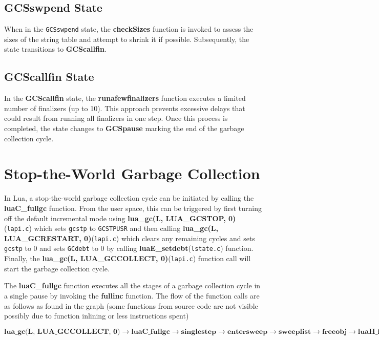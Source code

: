 \documentclass[10pt]{article}
\begin{document}
\subsection{GCSswpend State}
When in the \texttt{GCSswpend} state, the \textbf{checkSizes} function is invoked to assess the sizes of the string table and attempt to shrink it if possible. Subsequently, the state transitions to \textbf{GCScallfin}.

\subsection{GCScallfin State}
In the \textbf{GCScallfin} state, the \textbf{runafewfinalizers} function executes a limited number of finalizers (up to 10). This approach prevents excessive delays that could result from running all finalizers in one step. Once this process is completed, the state changes to \textbf{GCSpause} marking the end of the garbage collection cycle.

\section{Stop-the-World Garbage Collection} \label{sec:stop_the_world}
In Lua, a stop-the-world garbage collection cycle can be initiated by calling the \textbf{luaC\_fullgc} function. From the user space, this can be triggered by first turning off the default incremental mode using \textbf{lua\_gc(L, LUA\_GCSTOP, 0)}(\texttt{lapi.c}) which sets \texttt{gcstp} to \texttt{GCSTPUSR} and then calling \textbf{lua\_gc(L, LUA\_GCRESTART, 0)}(\texttt{lapi.c}) which clears any remaining cycles and sets \texttt{gcstp} to 0 and sets \texttt{GCdebt} to 0 by calling \textbf{luaE\_setdebt}(\texttt{lstate.c}) function.
 Finally, the \textbf{lua\_gc(L, LUA\_GCCOLLECT, 0)}(\texttt{lapi.c}) function call will start the garbage collection cycle.

The \textbf{luaC\_fullgc} function executes all the stages of a garbage collection cycle in a single pause by invoking the \textbf{fullinc} function.
The flow of the function calls are as follows as found in the graph (some functions from source code are not visible possibly due to function inlining or less instructions spent)
\vspace{-1em}

\[
\textbf{lua\_gc(L, LUA\_GCCOLLECT, 0)} \rightarrow \textbf{luaC\_fullgc} \rightarrow \textbf{singlestep} \rightarrow \textbf{entersweep} \rightarrow \textbf{sweeplist} \rightarrow \textbf{freeobj} \rightarrow \textbf{luaH\_free} \rightarrow \textbf{luaM\_free} \rightarrow \textbf{l\_alloc}
\]
\end{document}

